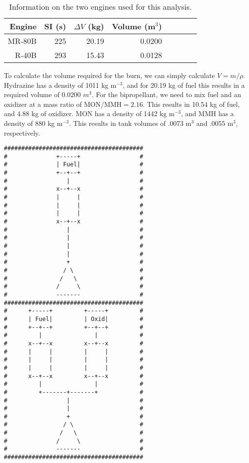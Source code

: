 \documentclass[onecolumn,10pt]{jhwhw}
\begin{document}
\begin{table}[h]
\begin{center}
\begin{tabular}{*{8}{r}}
\toprule
Engine & SI (s) & $\Delta V$ (kg) & Volume (m$^3$)\\
\midrule
MR-80B & 225 & 20.19 & 0.0200 \\
R-40B  & 293 & 15.43 & 0.0128 \\
\bottomrule
\end{tabular}
\end{center}
\caption{Information on the two engines used for this analysis.}
\label{fuel_table}
\end{table}

To calculate the volume required for the burn, we can simply calculate $V = m/\rho$. Hydrazine has a density of 1011 kg m$^{-3}$, and for 20.19 kg of fuel this results in a required volume of 0.0200 $m^3$. For the bipropellant, we need to mix fuel and an oxidizer at a mass ratio of MON/MMH$ = 2.16$. This results in 10.54 kg of fuel, and 4.88 kg of oxidizer. MON has a density of 1442 kg m$^{-3}$, and MMH has a density of 880 kg m$^{-3}$. This results in tank volumes of .0073 m$^3$ and .0055 m$^3$, respectively.

\begin{lstlisting}[caption={Serial and parallel valve designs for monoprop and bipropellant systems. Each x represents a valve.}]
########################################
#              +-----+                 #
#              | Fuel|                 #
#              +--+--+                 #
#                 |                    #
#              x--+--x                 #
#              |     |                 #
#              |     |                 #
#              |     |                 #
#              x--+--x                 #
#                 |                    #
#                 |                    #
#                 |                    #
#                 |                    #
#                 +                    #
#                / \                   #
#               /   \                  #
#              /     \                 #
#              -------                 #
########################################
#      +-----+         +-----+         #
#      | Fuel|         | Oxid|         #
#      +--+--+         +--+--+         #
#         |               |            #
#      x--+--x         x--+--x         #
#      |     |         |     |         #
#      |     |         |     |         #
#      |     |         |     |         #
#      x--+--x         x--+--x         #
#         |               |            #
#         +-------+-------+            #
#                 |                    #
#                 |                    #
#                 +                    #
#                / \                   #
#               /   \                  #
#              /     \                 #
#              -------                 #
########################################
\end{lstlisting}
\end{document}

